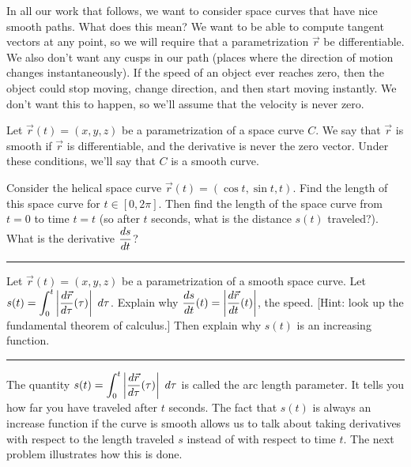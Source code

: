 In all our work that follows, we want to consider space curves that have nice smooth paths.  What does this mean?  We want to be able to compute tangent vectors at any point, so we will require that a parametrization $\vec r$ be differentiable.  We also don't want any cusps in our path (places where the direction of motion changes instantaneously). If the speed of an object ever reaches zero, then the object could stop moving, change direction, and then start moving instantly. We don't want this to happen, so we'll assume that the velocity is never zero.
\begin{definition}
 Let $\vec r(t)=(x,y,z)$ be a parametrization of a space curve $C$. We say that $\vec r$ is smooth if $\vec r$ is differentiable, and the derivative is never the zero vector. Under these conditions, we'll say that $C$ is a smooth curve. 
\end{definition}

\begin{problem}
 Consider the helical space curve $\vec r(t)=(\cos t, \sin t, t)$. Find the length of this space curve for $t\in[0,2\pi]$.  Then find the length of the space curve from $t=0$ to time $t=t$ (so after $t$ seconds, what is the distance $s(t)$ traveled?). What is the derivative $\displaystyle\frac{ds}{dt}$?
\hrule\end{problem}

\begin{problem}\label{fundamental theorem of calculus as it applies to arc length parameter}%
 Let $\vec r(t)=(x,y,z)$ be a parametrization of a smooth space curve. Let $\displaystyle s(t)=\int_0^t \left|\frac {d\vec r}{d\tau}(\tau) \right|\ d\tau$.  Explain why $\displaystyle\frac{ds}{dt}(t) = \left|\frac {d\vec r}{dt}(t) \right|$, the speed. [Hint: look up the fundamental theorem of calculus.] Then explain why $s(t)$ is an increasing function.
\hrule\end{problem}

The quantity $\displaystyle s(t)=\int_0^t \left|\frac {d\vec r}{d\tau}(\tau) \right|\ d\tau$ is called the arc length parameter.  It tells you how far you have traveled after $t$ seconds.  The fact that $s(t)$ is always an increase function if the curve is smooth allows us to talk about taking derivatives with respect to the length traveled $s$ instead of with respect to time $t$.  The next problem illustrates how this is done.

